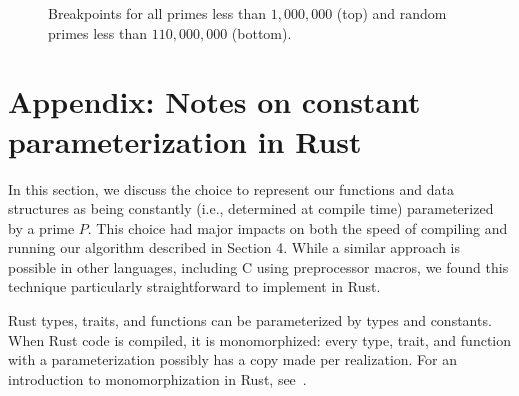 \documentclass{article}
\theoremstyle{definition}
\theoremstyle{remark}
\begin{document}
\begin{figure}[tbph]
\begin{center}
    

    
    \caption{Breakpoints for all primes less than $1,000,000$ (top) and random primes less than $110,000,000$ (bottom).}%
    \label{fig:breakpoints}
\end{center}
\end{figure}%

\section*{Appendix: Notes on constant parameterization in Rust}
In this section, we discuss the choice to represent our functions and data structures as being constantly (i.e., determined at compile time) parameterized by a prime $P$.
This choice had major impacts on both the speed of compiling and running our algorithm described in Section 4.
While a similar approach is possible in other languages, including C using preprocessor macros, we found this technique particularly straightforward to implement in Rust.

Rust types, traits, and functions can be parameterized by types and constants.
When Rust code is compiled, it is monomorphized: every type, trait, and function with a parameterization possibly has a copy made per realization.
For an introduction to monomorphization in Rust, see~\cite{rust-language}.
\end{document}
